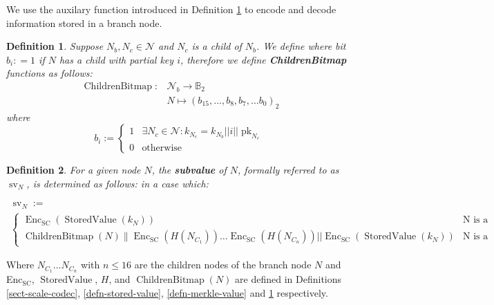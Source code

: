 \documentclass{book}
\newcommand{\assign}{:=}
\newcommand{\nobracket}{}
\newcommand{\tmop}[1]{\ensuremath{\operatorname{#1}}}
\newcommand{\tmrsub}[1]{\ensuremath{_{\textrm{#1}}}}
\newcommand{\tmstrong}[1]{\textbf{#1}}
\newcommand{\tmtextbf}[1]{{\bfseries{#1}}}
\newcommand{\tmtexttt}[1]{{\ttfamily{#1}}}
\newcommand{\tmverbatim}[1]{{\ttfamily{#1}}}
\newtheorem{definition}{Definition}
\providecommand{\nobracket}{}
\providecommand{\tmop}[1]{\ensuremath{\mathrm{#1}}}
\providecommand{\tmrsub}[1]{\tmrsub{\ensuremath{\mathrm{#1}}}}
\providecommand{\tmstrong}[1]{\tmtextbf{#1}}
\providecommand{\tmtextbf}[1]{\tmtextbf{#1}}
\providecommand{\tmverbatim}[1]{\tmtexttt{#1}}
\newtheorem{definition}{Definition}
\begin{document}
We use the auxilary function introduced in Definition
\ref{defn-children-bitmap} to encode and decode information stored in a branch
node.

\begin{definition}
  \label{defn-children-bitmap}Suppose $N_b, N_c \in \mathcal{N}$ and $N_c$ is
  a child of $N_b$. We define where bit $b_i : = 1$ if $N$ has a child with
  partial key $i$, therefore we define {\tmstrong{ChildrenBitmap}} functions
  as follows:
  \[ \begin{array}{cc}
       \tmop{ChildrenBitmap} : & \mathcal{N}_b \rightarrow \mathbb{B}_2\\
       & N \mapsto (b_{15}, \ldots, b_8, b_7, \ldots b_0)_2
     \end{array} \]
  where
  \[ b_i \assign \left\{ \begin{array}{cc}
       1 & \exists N_c \in \mathcal{N}: k_{N_c} = k_{N_b} | | i | |
       \tmop{pk}_{N_c}\\
       0 & \text{otherwise}
     \end{array} \right. \]
\end{definition}

\tmverbatim{}

\begin{definition}
  \label{defn-node-subvalue}For a given node $N$, the {\tmstrong{subvalue}} of
  $N$, formally referred to as $\tmop{sv}_N$, is determined as follows: in a
  case which:
  \begin{itemize}
    \[ \begin{array}{l}
         \tmop{sv}_N \assign\\
         \left\{ \begin{array}{cc}
           \tmop{Enc}_{\tmop{SC}} (\tmop{StoredValue} (k_N)) & \text{N is a
           leaf node}\\
           \nobracket \tmop{ChildrenBitmap} (N)\| \tmop{Enc}_{\tmop{SC}} (H
           (N_{C_1})) \ldots \tmop{Enc}_{\tmop{SC}} (H (N_{C_n})) | |
           \tmop{Enc}_{\tmop{SC}} (\tmop{StoredValue} (k_N))  & \text{N is a
           branch node}
         \end{array} \right.
       \end{array} \]
  \end{itemize}
\end{definition}

Where $N_{C_1} \ldots N_{C_n}$ with $n \leqslant 16$ are the children nodes of
the branch node $N$ and Enc\tmrsub{SC}, $\tmop{StoredValue}$, $H$, and
$\tmop{ChildrenBitmap} (N)$ are defined in Definitions \ref{sect-scale-codec},
\ref{defn-stored-value}, \ref{defn-merkle-value} and
\ref{defn-children-bitmap} respectively.
\end{document}
